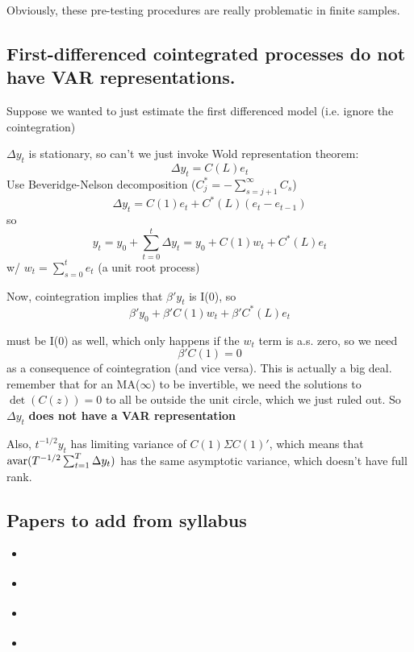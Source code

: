 Obviously, these pre-testing procedures are really problematic in
finite samples.

\subsection{First-differenced cointegrated processes do not have VAR
  representations.}

Suppose we wanted to just estimate the first differenced model
(i.e. ignore the cointegration)

$\Delta y_t$ is stationary, so can't we just invoke Wold representation
theorem:
\[\Delta  y_t = C(L) e_t\]
Use Beveridge-Nelson decomposition ($C^*_j = - \sum_{s=j+1}^\infty C_s$)
\[\Delta y_t = C(1) e_t + C^*(L) (e_t - e_{t-1})\]
so
\[y_t = y_0 + \sum_{t=0}^t \Delta  y_t = y_0 + C(1) w_t + C^*(L) e_t\]
w/ $w_t = \sum_{s=0}^t e_t$ (a unit root process)

Now, cointegration implies that $\beta'y_t$ is I(0), so
\[\beta'y_0 + \beta'C(1) w_t + \beta'C^*(L) e_t\]

must be I(0) as well, which only happens if the $w_t$ term is a.s. zero,
so we need
\[\beta'C(1) = 0\] as a consequence of cointegration (and vice
versa). This is actually a big deal. remember that for an MA($\infty$) to be
invertible, we need the solutions to $\det(C(z)) = 0$ to all be
outside the unit circle, which we just ruled out.  So $\Delta y_t$
\textbf{does not have a VAR representation}

Also, $t^{-1/2} y_t$ has limiting variance of $C(1) \Sigma C(1)'$, which
means that $\operatorname{avar}(T^{-1/2} \sum_{t=1}^T \Delta y_t)$ has the same asymptotic
variance, which doesn't have full rank.

\subsection{Papers to add from syllabus}
\begin{itemize}
\item \citet{EG87}
\item \citet{Jo88}
\item \citet{Jo91}
\item \citet{Wa94}
\end{itemize}


